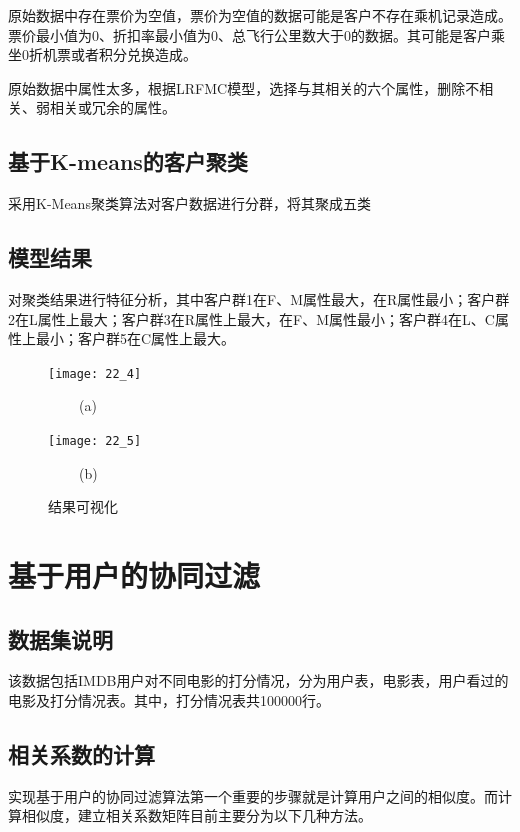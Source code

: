 \documentclass[withoutpreface,bwprint]{cumcmthesis} %
\begin{document}
	\par 原始数据中存在票价为空值，票价为空值的数据可能是客户不存在乘机记录造成。票价最小值为0、折扣率最小值为0、总飞行公里数大于0的数据。其可能是客户乘坐0折机票或者积分兑换造成。
	
	
	\par 原始数据中属性太多，根据LRFMC模型，选择与其相关的六个属性，删除不相关、弱相关或冗余的属性。
	
	
	
	
	\subsection{基于K-means的客户聚类}
	
	\par 采用K-Means聚类算法对客户数据进行分群，将其聚成五类
	
	\subsection{模型结果}
	\par 对聚类结果进行特征分析，其中客户群1在F、M属性最大，在R属性最小；客户群2在L属性上最大；客户群3在R属性上最大，在F、M属性最小；客户群4在L、C属性上最小；客户群5在C属性上最大。
	
	\begin{figure}[H]
		\centering
		\begin{minipage}[t]{0.48\textwidth}
			\centering
			\texttt{[image: 22\_4]}
			\centerline{$\ \ \ \ \ \ \ \ \ \ $(a)}
		\end{minipage}
		\begin{minipage}[t]{0.48\textwidth}
			\centering
			\texttt{[image: 22\_5]}
			\centerline{$\ \ \ \ \ \ \ \ \ \ $(b)}
		\end{minipage}
		
		\caption{结果可视化}
	\end{figure}
	
	\newpage
	
	\section{基于用户的协同过滤}
	\subsection{数据集说明}
	\par 该数据包括IMDB用户对不同电影的打分情况，分为用户表，电影表，用户看过的电影及打分情况表。其中，打分情况表共100000行。
	\subsection{相关系数的计算}
	实现基于用户的协同过滤算法第一个重要的步骤就是计算用户之间的相似度。而计算相似度，建立相关系数矩阵目前主要分为以下几种方法。
\end{document}
